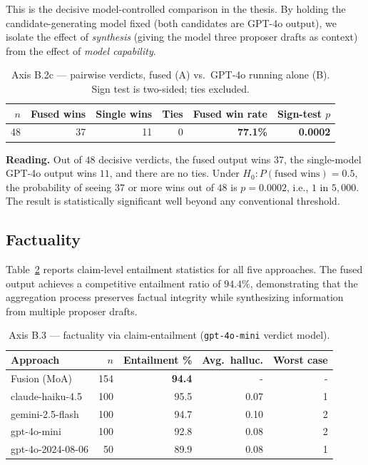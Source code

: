 This is the decisive model-controlled comparison in the thesis. By
holding the candidate-generating model fixed (both candidates are
GPT-4o output), we isolate the effect of \textit{synthesis} (giving
the model three proposer drafts as context) from the effect of
\textit{model capability}.

\begin{table}[H]
  \centering
  \caption{Axis B.2c --- pairwise verdicts, fused (A) vs.\ GPT-4o
  running alone (B). Sign test is two-sided; ties excluded.}
  \label{tab:axisB2c}
  \begin{tabular}{rrrrrr}
    \toprule
    $n$ & Fused wins & Single wins & Ties & Fused win rate & Sign-test $p$ \\
    \midrule
    48 & 37 & 11 & 0 & \textbf{77.1\%} & \textbf{0.0002} \\
    \bottomrule
  \end{tabular}
\end{table}

\textbf{Reading.} Out of $48$ decisive verdicts, the fused output wins
$37$, the single-model GPT-4o output wins $11$, and there are no ties.
Under $H_0: P(\text{fused wins}) = 0.5$, the probability of seeing $37$
or more wins out of $48$ is $p = 0.0002$, i.e., $1$ in $5{,}000$. The
result is statistically significant well beyond any conventional
threshold.



\subsection{Factuality}

Table~\ref{tab:axisB3} reports claim-level entailment statistics for
all five approaches. The fused output achieves a competitive entailment 
ratio of $94.4\%$, demonstrating that the aggregation process preserves 
factual integrity while synthesizing information from multiple 
proposer drafts.

\begin{table}[H]
  \centering
  \caption{Axis B.3 --- factuality via claim-entailment
  (\texttt{gpt-4o-mini} verdict model).}
  \label{tab:axisB3}
  \begin{tabular}{lrrrr}
    \toprule
    Approach & $n$ & Entailment \% & Avg.\ halluc. & Worst case \\
    \midrule
    Fusion (MoA)        & 154 & \textbf{94.4} & - & - \\
    claude-haiku-4.5    & 100 & 95.5 & 0.07 & 1 \\
    gemini-2.5-flash    & 100 & 94.7 & 0.10 & 2 \\
    gpt-4o-mini         & 100 & 92.8 & 0.08 & 2 \\
    gpt-4o-2024-08-06   & 50  & 89.9 & 0.08 & 1 \\
    \bottomrule
  \end{tabular}
\end{table}


